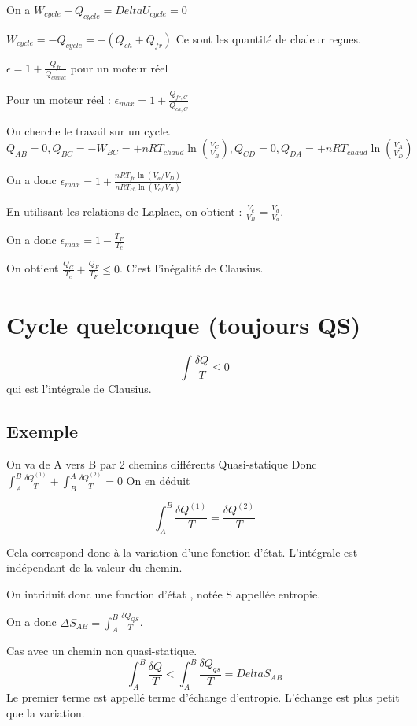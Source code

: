 \documentclass[french]{yLectureNote}
\begin{document}
On a $W_{cycle} + Q_{cycle} = Delta U_{cycle} = 0$

$W_{cycle} = - Q_{cycle} = -(Q_{ch} + Q_{fr})$ Ce sont les quantité de chaleur reçues.

$\epsilon = 1+ \frac{Q_{fr}}{Q_{chaud}}$ pour un moteur réel

Pour un moteur réel : $\epsilon_{max} = 1+\frac{Q_{fr,C}}{Q_{ch, C}}$

On cherche le travail sur un cycle.
$Q_{AB} = 0, Q_{BC} = -W_{BC} = + nRT_{chaud}\ln(\frac{V_C}{V_B}), Q_{CD} = 0, Q_{DA} = + nRT_{chaud}\ln(\frac{V_A}{V_D})$


On a donc $\epsilon_{max} = 1+ \frac{nR T_{fr}\ln(V_a/V_D)}{nRT_{ch}\ln(V_c/V_B)}$

En utilisant les relations de Laplace, on obtient : $\frac{V_c}{V_B} = \frac{V_d}{V_a}$.

On a donc $\epsilon_{max} = 1-\frac{T_F}{T_c}$

On obtient $\frac{Q_C}{T_c}+\frac{Q_F}{T_F}\leq 0$. C'est l'inégalité de Clausius.
\section{Cycle quelconque (toujours QS)}
$$\int \frac{\delta Q}{T}\leq 0$$ qui est l'intégrale de Clausius.
\subsection{Exemple}
On va de A vers B par 2 chemins différents Quasi-statique
Donc $\int_A^B \frac{\delta Q^{(1)}}{T}+\int_B^A\frac{\delta Q^{(2)}}{T} = 0$
On en déduit
\begin{theorem}
    $$\int_A^B \frac{\delta Q^{(1)}}{T} = \frac{\delta Q^{(2)}}{T}$$
\end{theorem}
Cela correspond donc à la variation d'une fonction d'état. L'intégrale est indépendant de la valeur du chemin.

On intriduit donc une fonction d'état , notée S appellée entropie.

On a donc $\Delta S_{AB} = \int_A^B \frac{\delta Q_{QS}}{T}$.

Cas avec un chemin non quasi-statique.
$$\int_A^B \frac{\delta Q}{T} < \int_A^B \frac{\delta Q_{qs}}{T} = Delta S_{AB}$$
Le premier terme est appellé terme d'échange d'entropie. L'échange est plus petit que la variation.
\end{document}
